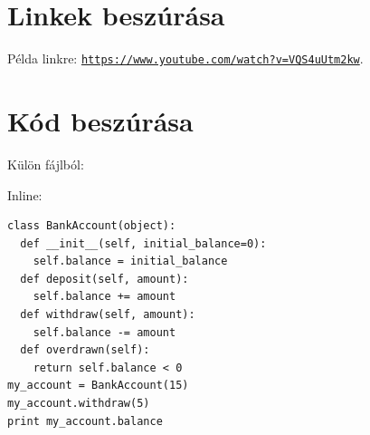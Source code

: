 \section{Linkek beszúrása}\label{sec:links}

Példa linkre: \href{https://www.youtube.com/watch?v=VQS4uUtm2kw}{\texttt{https://www.youtube.com/watch?v=VQS4uUtm2kw}}.

\pagebreak
\section{Kód beszúrása}
Külön fájlból:


Inline:
\begin{verbatim}
class BankAccount(object):
  def __init__(self, initial_balance=0):
    self.balance = initial_balance
  def deposit(self, amount):
    self.balance += amount
  def withdraw(self, amount):
    self.balance -= amount
  def overdrawn(self):
    return self.balance < 0
my_account = BankAccount(15)
my_account.withdraw(5)
print my_account.balance
\end{verbatim}

\pagebreak
